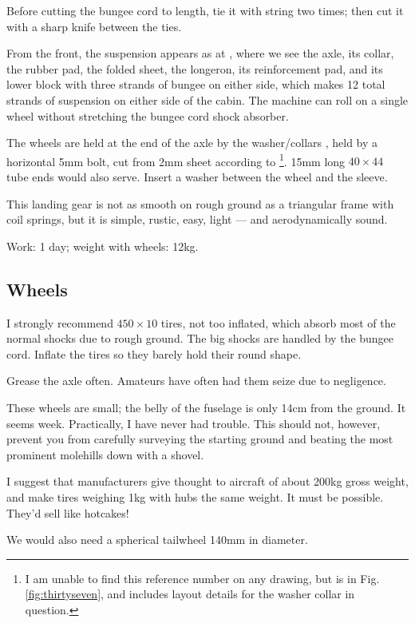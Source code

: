 \documentclass{book}
\newcommand*\circled[1]{\tikz[baseline=(char.base)]{
    \node[shape=circle,draw,inner sep=0.15pt] (char) {\footnotesize#1};}}
\begin{document}
Before cutting the bungee cord to length, tie it with string two
times; then cut it with a sharp knife between the ties.

From the front, the suspension appears as at \circled{160}, where we
see the axle, its collar, the rubber pad, the folded sheet, the
longeron, its reinforcement pad, and its lower block with three
strands of bungee on either side, which makes 12 total strands of
suspension on either side of the cabin.  The machine can roll on a
single wheel without stretching the bungee cord shock absorber.

The wheels are held at the end of the axle by the washer/collars
\circled{161}, held by a horizontal 5mm bolt, cut from 2mm sheet
according to \circled{162}\footnote{I am unable to find this reference
  number on any drawing, but \circled{161} is in
  Fig. \ref{fig:thirtyseven}, and includes layout details for the
  washer collar in question.}.  15mm long $40\times44$ tube ends would
also serve.  Insert a washer between the wheel and the sleeve.

This landing gear is not as smooth on rough ground as a triangular
frame with coil springs, but it is simple, rustic, easy, light --- and
aerodynamically sound.

Work: 1 day; weight with wheels: 12kg.

\subsection{Wheels}

I strongly recommend $450\times10$ tires, not too inflated, which
absorb most of the normal shocks due to rough ground.  The big shocks
are handled by the bungee cord.  Inflate the tires so they barely hold
their round shape.

Grease the axle often.  Amateurs have often had them seize due to
negligence.

These wheels are small; the belly of the fuselage is only 14cm from
the ground.  It seems week.  Practically, I have never had trouble.
This should not, however, prevent you from carefully surveying the
starting ground and beating the most prominent molehills down with a
shovel.

I suggest that manufacturers give thought to aircraft of about 200kg
gross weight, and make tires weighing 1kg with hubs the same weight.
It must be possible.  They'd sell like hotcakes!

We would also need a spherical tailwheel 140mm in diameter.
\end{document}
